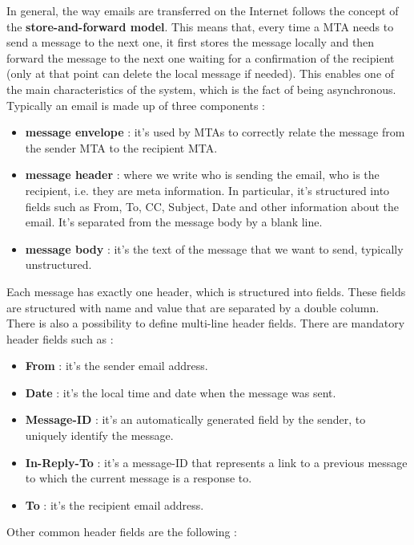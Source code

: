In general, the way emails are transferred on the Internet follows the concept of the \textbf{store-and-forward model}. This means that, every time a MTA needs to send a message to the next one, it first stores the message locally and then forward the message to the next one waiting for a confirmation of the recipient (only at that point can delete the local message if needed). This enables one of the main characteristics of the system, which is the fact of being asynchronous. Typically an email is made up of three components :
\begin{itemize}
\item \textbf{message envelope} : it's used by MTAs to correctly relate the message from the sender MTA to the recipient MTA.
\item \textbf{message header} : where we write who is sending the email, who is the recipient, i.e. they are meta information. In particular, it's structured into fields such as From, To, CC, Subject, Date and other information about the email. It's separated from the message body by a blank line.
\item \textbf{message body} : it's the text of the message that we want to send, typically unstructured.
\end{itemize}
Each message has exactly one header, which is structured into fields. These fields are structured with name and value that are separated by a double column. There is also a possibility to define multi-line header fields. There are mandatory header fields such as :
\begin{itemize}
\item \textbf{From} : it's the sender email address.
\item \textbf{Date} : it's the local time and date when the message was sent.
\item \textbf{Message-ID} : it's an automatically generated field by the sender, to uniquely identify the message.
\item \textbf{In-Reply-To} : it's a message-ID that represents a link to a previous message to which the current message is a response to.
\item \textbf{To} : it's the recipient email address.
\end{itemize}
Other common header fields are the following :
